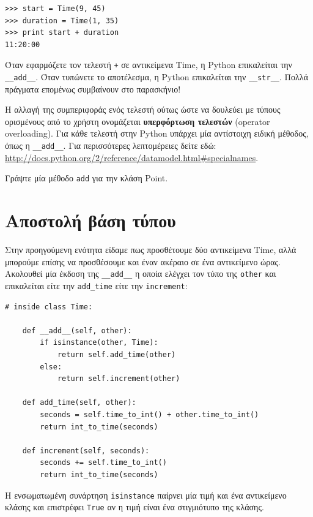 \documentclass[10pt]{book}
\begin{document}
\begin{verbatim}
>>> start = Time(9, 45)
>>> duration = Time(1, 35)
>>> print start + duration
11:20:00
\end{verbatim}
%
Όταν εφαρμόζετε τον τελεστή {\tt +} σε αντικείμενα Time, η Python επικαλείται την \verb"__add__".
Όταν τυπώνετε το αποτέλεσμα, η Python επικαλείται την \verb"__str__". Πολλά πράγματα επομένως συμβαίνουν
στο παρασκήνιο!

Η αλλαγή της συμπεριφοράς ενός τελεστή ούτως ώστε να δουλεύει με τύπους ορισμένους από το χρήστη ονομάζεται 
{\bf υπερφόρτωση τελεστών} (operator overloading). Για κάθε τελεστή στην Python υπάρχει μία αντίστοιχη ειδική
μέθοδος, όπως η \verb"__add__". Για περισσότερες λεπτομέρειες δείτε εδώ: \url{http://docs.python.org/2/reference/datamodel.html#specialnames}.
\\
 
\begin{exercise}

Γράψτε μία μέθοδο {\tt add} για την κλάση Point.
\end{exercise}


 
\section{Αποστολή βάση τύπου}

Στην προηγούμενη ενότητα είδαμε πως προσθέτουμε δύο αντικείμενα Time, αλλά μπορούμε επίσης να προσθέσουμε και
έναν ακέραιο σε ένα αντικείμενο ώρας. Ακολουθεί μία έκδοση της \verb"__add__" η οποία ελέγχει τον τύπο της
{\tt other} και επικαλείται είτε την  \verb"add_time"  είτε την  {\tt increment}:

\begin{verbatim}
# inside class Time:

    def __add__(self, other):
        if isinstance(other, Time):
            return self.add_time(other)
        else:
            return self.increment(other)

    def add_time(self, other):
        seconds = self.time_to_int() + other.time_to_int()
        return int_to_time(seconds)

    def increment(self, seconds):
        seconds += self.time_to_int()
        return int_to_time(seconds)
\end{verbatim}
%
Η ενσωματωμένη συνάρτηση {\tt isinstance} παίρνει μία τιμή και ένα αντικείμενο κλάσης και επιστρέφει
{\tt True} αν η τιμή είναι ένα στιγμιότυπο της κλάσης.
\end{document}
